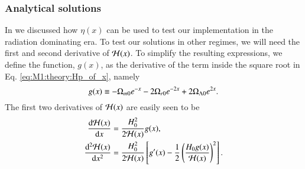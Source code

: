 \subsubsection{Analytical solutions} \label{subsec:M1:theory:analytical_solutions}
In  we discussed how $\eta(x)$ can be used to test our implementation in the radiation dominating era. To test our solutions in other regimes, we will need the first and second derivative of $\mathcal{H}(x)$. To simplify the resulting expressions, we define the function, $g(x)$, as the derivative of the term inside the square root in Eq. \eqref{eq:M1:theory:Hp_of_x}, namely 
\begin{equation}
    g(x) \equiv -\Omega_{m0} e^{-x} -2\Omega_{r0} e^{-2x} + 2\Omega_{\Lambda 0} e^{2x}. \label{eq:M1:theory:g_of_x} 
\end{equation} 
%
The first two derivatives of $\mathcal{H}(x)$ are easily seen to be   
\begin{align} 
    \dv{\mathcal{H}(x)}{x} &= \frac{H_0^2}{2\mathcal{H}(x)}g(x), \label{eq:M1:theory:dHp_dx} \\
    \dv[2]{\mathcal{H}(x)}{x} &= \frac{H_0^2}{2\mathcal{H}(x)}\left[ g'(x) - \frac{1}{2}\left( \frac{H_0 g(x)}{\mathcal{H}(x)} \right)^2 \right]. \label{eq:M1:theory:ddHp_ddx}
\end{align}
%

